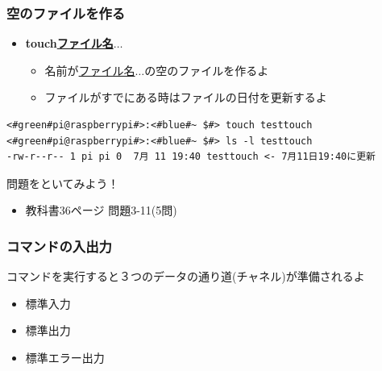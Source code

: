 \documentclass[slide03.tex]{subfiles}
\begin{document}
\begin{frame}[fragile]
    \frametitle{空のファイルを作る}
    \begin{itemize}
        \item {\bf touch\textvisiblespace\underline{ファイル名}$\ldots$}
        \begin{itemize}
            \small
            \item[] 名前が\underline{ファイル名}$\ldots$の空のファイルを作るよ
            \item[] ファイルがすでにある時はファイルの日付を更新するよ
        \end{itemize}
    \end{itemize}
    \begin{lstlisting}[title=空のファイルを作成, label=cmd:touch]
<#green#pi@raspberrypi#>:<#blue#~ $#> touch testtouch
<#green#pi@raspberrypi#>:<#blue#~ $#> ls -l testtouch
-rw-r--r-- 1 pi pi 0  7月 11 19:40 testtouch <- 7月11日19:40に更新
    \end{lstlisting}
\end{frame}

\begin{frame}
    \begin{exampleblock}{問題をといてみよう！}
        \begin{itemize}
            \item 教科書36ページ 問題3-11(5問)
        \end{itemize}
    \end{exampleblock}
\end{frame}

\begin{frame}
    \frametitle{コマンドの入出力}
    \vspace{1em}
    コマンドを実行すると３つのデータの通り道(チャネル)が準備されるよ
    \begin{itemize}
        \item 標準入力
        \item 標準出力
        \item 標準エラー出力
    \end{itemize}
    \begin{figure}[h]
        \centering
        
    \end{figure}
\end{frame}
\end{document}
